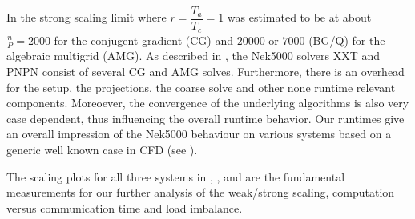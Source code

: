 \documentclass{sig-alternate}
\begin{document}
In \cite{fischer:scaling} the strong scaling limit where $r=\dfrac{T_a}{T_c}=1$ was estimated
to be at about $\frac{n}{P}=2000$ for the conjugent gradient (CG) and $20000$ or
$7000$ (BG/Q) for the algebraic multigrid (AMG). As described in , the
Nek5000 solvers XXT and PNPN consist of several CG and AMG solves. Furthermore,
there is an overhead for the setup, the projections, the coarse solve and other
none runtime relevant components. Moreoever, the convergence of the underlying
algorithms is also very case dependent, thus influencing the overall runtime
behavior. Our runtimes give an overall impression of the Nek5000 behaviour on
various systems based on a generic well known case in CFD (see
). 

The scaling plots for all three
systems in , , and  are the fundamental
measurements for our further analysis of the weak/strong scaling, computation
versus communication time and load imbalance.
\end{document}
